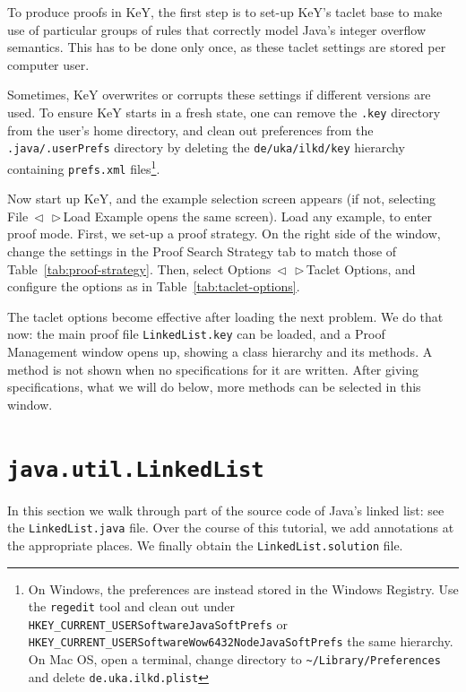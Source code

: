 \documentclass[runningheads]{llncs}
\makeatletter
\DeclareRobustCommand*{\lyxarrow}{%
\@ifstar
{\leavevmode\,$\triangleleft$\,\allowbreak}
{\leavevmode\,$\triangleright$\,\allowbreak}}
\def\bs{\char092}
\makeatother
\begin{document}
To produce proofs in KeY, the first step is to set-up KeY's taclet base to make use of particular groups of rules that correctly model Java's integer overflow semantics. This has to be done only once, as these taclet settings are stored per computer user.

Sometimes, KeY overwrites or corrupts these settings if different versions are used. To ensure KeY starts in a fresh state, one can remove the \texttt{.key} directory from the user's home directory, and clean out preferences from the \texttt{.java/.userPrefs} directory by deleting the \texttt{de/uka/ilkd/key} hierarchy containing \texttt{prefs.xml} files\footnote{On Windows, the preferences are instead stored in the Windows Registry. Use the \texttt{regedit} tool and clean out under \texttt{HKEY\_CURRENT\_USER\bs Software\bs JavaSoft\bs Prefs} or \texttt{HKEY\_CURRENT\_USER\bs Software\bs Wow6432Node\bs JavaSoft\bs Prefs} the same hierarchy. On Mac OS, open a terminal, change directory to \texttt{\textasciitilde/Library/Preferences} and delete \texttt{de.uka.ilkd.plist}}.

Now start up KeY, and the example selection screen appears (if not, selecting File\lyxarrow Load Example opens the same screen). Load any example, to enter proof mode. 
First, we set-up a proof strategy. On the right side of the window, change the settings in the Proof Search Strategy tab to match those of Table~\ref{tab:proof-strategy}. Then, select Options\lyxarrow Taclet Options, and configure the options as in Table~\ref{tab:taclet-options}.

The taclet options become effective after loading the next problem. We do that now: the main proof file \texttt{LinkedList.key} can be loaded, and a Proof Management window opens up, showing a class hierarchy and its methods. A method is not shown when no specifications for it are written. After giving specifications, what we will do below, more methods can be selected in this window.

\section{\texttt{java.util.LinkedList}}\label{sec:linkedlist}

In this section we walk through part of the source code of Java's linked list: see the \texttt{LinkedList.java} file. Over the course of this tutorial, we add annotations at the appropriate places. We finally obtain the \texttt{LinkedList.solution} file.
\end{document}
